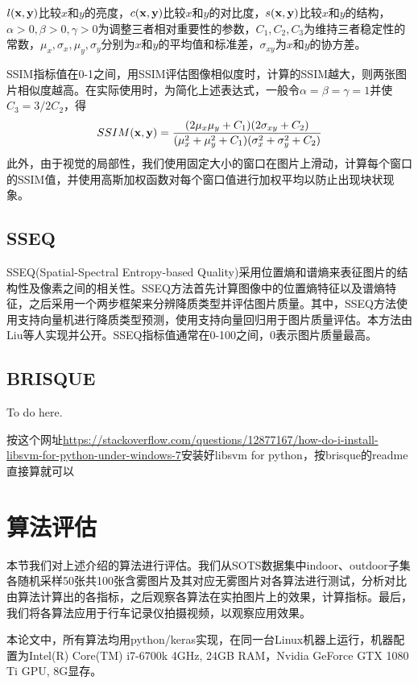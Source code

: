 \documentclass[a4paper, 12pt, oneside]{report}
\begin{document}
{$l{\bf (x, y)}$比较$x$和$y$的亮度，$c{\bf (x, y)}$比较$x$和$y$的对比度，$s{\bf (x, y)}$比较$x$和$y$的结构，$\alpha > 0, \beta > 0, \gamma > 0$为调整三者相对重要性的参数，$C_1, C_2, C_3$为维持三者稳定性的常数，$\mu_x, \sigma_x, \mu_y, \sigma_y$分别为$x$和$y$的平均值和标准差，$\sigma_{xy}$为$x$和$y$的协方差。

SSIM指标值在0-1之间，用SSIM评估图像相似度时，计算的SSIM越大，则两张图片相似度越高。在实际使用时，为简化上述表达式，一般令$\alpha = \beta = \gamma = 1$并使$C_3 = 3/2 C_2$，得
\begin{equation}
SSIM({\bf x, y}) = \frac{(2\mu_x\mu_y + C_1)(2\sigma_{xy}+ C_2)}{(\mu_x^2 + \mu_y^2 + C_1)(\sigma_x^2 + \sigma_y^2 + C_2)}
\end{equation}
此外，由于视觉的局部性，我们使用固定大小的窗口在图片上滑动，计算每个窗口的SSIM值，并使用高斯加权函数对每个窗口值进行加权平均以防止出现块状现象。

\subsection{SSEQ\quad}
SSEQ\cite{ref25}(Spatial-Spectral Entropy-based Quality)采用位置熵和谱熵来表征图片的结构性及像素之间的相关性。SSEQ方法首先计算图像中的位置熵特征以及谱熵特征，之后采用一个两步框架来分辨降质类型并评估图片质量。其中，SSEQ方法使用支持向量机进行降质类型预测，使用支持向量回归用于图片质量评估。本方法由Liu等人实现并公开。SSEQ指标值通常在0-100之间，0表示图片质量最高。

\subsection{BRISQUE\quad}
To do here\cite{ref26}.

按这个网址\url{https://stackoverflow.com/questions/12877167/how-do-i-install-libsvm-for-python-under-windows-7}安装好libsvm for python，按brisque的readme直接算就可以

\section{算法评估\quad}
本节我们对上述介绍的算法进行评估。我们从SOTS数据集中indoor、outdoor子集各随机采样50张共100张含雾图片及其对应无雾图片对各算法进行测试，分析对比由算法计算出的各指标，之后观察各算法在实拍图片上的效果，计算指标。最后，我们将各算法应用于行车记录仪拍摄视频，以观察应用效果。

本论文中，所有算法均用python/keras实现，在同一台Linux机器上运行，机器配置为Intel(R) Core(TM) i7-6700k 4GHz, 24GB RAM，Nvidia GeForce GTX 1080 Ti GPU, 8G显存。

}
\end{document}
